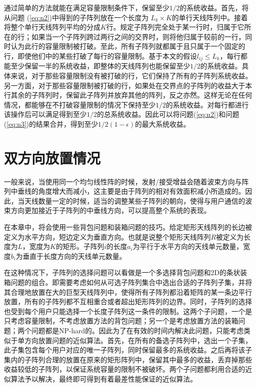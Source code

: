 通过简单的方法就能在满足容量限制条件下，保留至少$1/2$的系统收益。首先，将从问题 (\ref{eq:n2})中得到的子阵列放在一个长度为 $L_k \times K$的单行天线阵列中。接着将整个单行天线阵列平均的分成$K$行。规定子阵列完全处于某一行时，归属于它所在的行；如果当一个子阵列跨过两行之间的交界时，则将他归属于较前的一行，同时认为此行的容量限制被打破。至此，所有子阵列就都属于且只属于一个固定的行，即使他们中的某些打破了每行的容量限制。基于本文的假设$l_{ij} \leq L_k$，每行都能至少保留一半的系统收益，即整体的天线阵列也能保留至少$1/2$的系统收益。具体来说，对于那些容量限制没有被打破的行，它们保持了所有的子阵列系统收益。另一方面，对于那些容量限制被打破的行，如果处在交界点的子阵列的收益大于本行其余的子阵列时，保留此子阵列并放弃其他的阵列，反之亦然。这样无论在任何情况，都能够在不打破容量限制的情况下保持至少$1/2$的系统收益。对每行都进行该操作后可以满足得到至少$1/2$的总系统收益。因此可以将问题(\ref{eq:n2})和问题(\ref{eq:n3})的结果合并，得到至少$1/2(1-\epsilon)$的最大系统收益。

\section{双方向放置情况}

一般来说，当使用同一个均匀线性阵的时候，发射/接受增益会随着波束方向与阵列中垂线的角度增大而减小\cite{han2015large}，这主要是由于阵列的相对有效面积减小所造成的。因此，当天线数量一定的时候，适当的调整某些子阵列的朝向，使得与用户通信的波束方向更加接近于子阵列的中垂线方向，可以提高整个系统的表现。

在本章中，将会使用一些背包问题和装箱问题的技巧。给定矩形天线阵列的长边被定义为水平方向，短边定义为垂直方向。也就是说整个矩形天线阵列$R$被定义为长度为$L$，宽度为$K$的矩形。子阵列$i$的长度$a_i$为平行于水平方向的天线单元数量，宽度$b_i$为垂直于长度方向的天线单元数量。

在这种情况下，子阵列的选择问题可以看做是一个多选择背包问题和2D的条状装箱问题的组合。即需要考虑如何从可选子阵列集合中选出合适的子阵列子集，并将其合理地放置在大的巨型天线阵列中，使得所有子阵列都沿着矩阵的某一条边平行放置，所有的子阵列都不互相重合或者超出矩形阵列的边界。同时，子阵列的选择也受到每个用户只能选择一个长度子阵列这一条件的限制。这两个子问题，一个是只考虑容量限制，不考虑放置方法的背包问题；另一个是考虑放置方法的装箱问题；两个问题都是NP-hard的。因此为了在有效的时间内解决此问题，只能考虑类似于单方向放置问题的近似算法。首先，在所有的备选子阵列中，选出一个子集，此子集包含每个用户对应的唯一子阵列，同时保留最多的系统收益。之后再将该子集内的子阵列合理的放置在原来的矩形阵列中，保留其中最多的收益，丢弃掉那些收益较低的子阵列，以保证系统容量的限制不被破坏。两个子问题都利用合适的近似算法予以解决，最终即可得到有着最差性能保证的近似算法。

